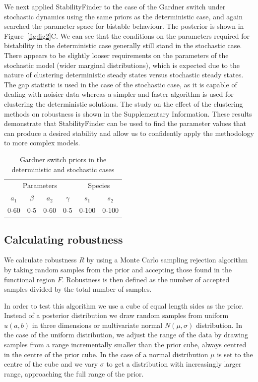 We next applied StabilityFinder to the case of the Gardner switch under stochastic dynamics using the same priors as the deterministic case, and again searched the parameter space for bistable behaviour. The posterior is shown in Figure~\ref{fig:fig2}C. We can see that the conditions on the parameters required for bistability in the deterministic case generally still stand in the stochastic case. There appears to be slightly looser requirements on the parameters of the stochastic model (wider marginal distributions), which is expected due to the nature of clustering deterministic steady states versus stochastic steady states. The gap statistic is used in the case of the stochastic case, as it is capable of dealing with noisier data whereas a simpler and faster algorithm is used for clustering the deterministic solutions. The study on the effect of the clustering methods on robustness is shown in the Supplementary Information. These results demonstrate that StabilityFinder can be used to find the parameter values that can produce a desired stability and allow us to confidently apply the methodology to more complex models.

\begin{table}[h]
\centering
\caption{Gardner switch priors in the deterministic and stochastic cases}
\label{tab:gard_det_stoch}
\begin{tabular}{@{}cccccc@{}}
\toprule
\multicolumn{4}{c}{Parameters}                          & \multicolumn{2}{c}{Species} \\ \cmidrule(lr){1-4}
\cmidrule(lr){5-6}
$a_1$ & $\beta$ & $a_2$ & \multicolumn{1}{c}{$\gamma$} & $s_1$        & $s_2$        \\
0-60  & 0-5     & 0-60  & 0-5                           & 0-100        & 0-100        \\ \bottomrule
\end{tabular}
\end{table}


\subsection{Calculating robustness}

We calculate robustness $R$ by using a Monte Carlo sampling rejection algorithm by taking random samples from the prior and accepting those found in the functional region $F$. Robustness is then defined as the number of accepted samples divided by the total number of samples.

 In order to test this algorithm we use a cube of equal length sides as the prior. Instead of a posterior distribution we draw random samples from uniform $u(a, b)$ in three dimensions or multivariate normal $N(\mu, \sigma)$ distribution. In the case of the uniform distribution, we adjust the range of the data by drawing samples from a range incrementally smaller than the prior cube, always centred in the centre of the prior cube. In the case of a normal distribution $\mu$ is set to the centre of the cube and we vary $\sigma$ to get a distribution with increasingly larger range, approaching the full range of the prior.  

